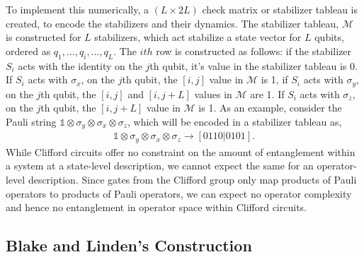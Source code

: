To implement this numerically, a $(L \times 2L)$ check matrix or stabilizer tableau is created, to encode the stabilizers and their dynamics. The stabilizer tableau, $\mathcal{M}$ is constructed for $L$ stabilizers, which act stabilize a state vector for $L$ qubits, ordered as $q_1, \dots, q_i, \dots, q_L$. The $ith$ row is constructed as follows: if the stabilizer $S_i$ acts with the identity on the $j$th qubit, it's value in the stabilizer tableau is 0. If $S_i$ acts with $\sigma_{x}$, on the $j$th qubit, the $[i,j]$ value in $\mathcal{M}$ is 1, if $S_i$ acts with $\sigma_{y}$, on the $j$th qubit, the $[i,j]$ and $[i, j+L]$ values in $\mathcal{M}$ are 1. If $S_i$ acts with $\sigma_{z}$, on the $j$th qubit, the $[i,j+L]$ value in $\mathcal{M}$ is 1. As an example, consider the Pauli string $ \mathbb{1} \otimes \sigma_{y} \otimes \sigma_{x} \otimes \sigma_{z}$, which will be encoded in a stabilizer tableau as, 
\begin{align*}
     \mathbb{1} \otimes \sigma_{y} \otimes \sigma_{x} \otimes \sigma_{z} \to [0 1 1 0| 0 1 0 1].
\end{align*}  
While Clifford circuits offer no constraint on the amount of entanglement within a system at a state-level description, we cannot expect the same for an operator-level description.  
Since gates from the Clifford group only map products of Pauli operators to products of Pauli operators, we can expect no operator complexity and hence no entanglement in operator space within Clifford circuits.

\subsection{Blake and Linden's Construction}

